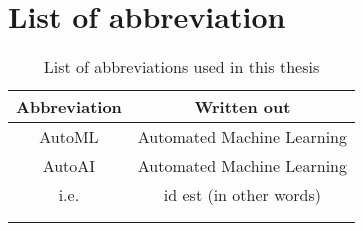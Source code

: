 %
\chapter*{List of abbreviation}
\label{sec:list of abbreviation}
\vspace*{-10mm}

\begin{table}[h!]
    \begin{tabular}{|c|c|}
    \hline
        Abbreviation & Written out \\ \hline
        AutoML & Automated Machine Learning \\ \hline
        AutoAI & Automated Machine Learning \\ \hline
        i.e. & id est (in other words)\\ \hline
         & \\ \hline
         & \\ \hline
    \end{tabular}
    \caption{List of abbreviations used in this thesis}
    \label{tab:my_label}
\end{table}